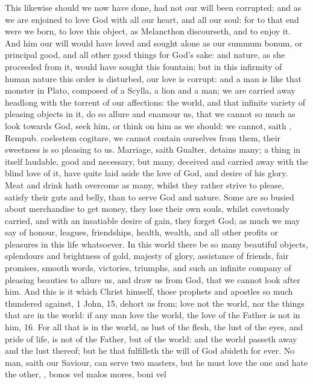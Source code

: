 {This likewise should we now have done, had not our will been corrupted;
and as we are enjoined to love God with all our heart, and all our
soul: for to that end were we born, to love this object, as
Melancthon discourseth, and to enjoy it. And him our will would
have loved and sought alone as our summum bonum, or principal good, and
all other good things for God's sake: and nature, as she proceeded from
it, would have sought this fountain; but in this infirmity of human
nature this order is disturbed, our love is corrupt: and a man is like
that monster in Plato, composed of a Scylla, a lion and a man; we
are carried away headlong with the torrent of our affections: the
world, and that infinite variety of pleasing objects in it, do so
allure and enamour us, that we cannot so much as look towards God, seek
him, or think on him as we should: we cannot, saith \Austin{}, Rempub.
coelestem cogitare, we cannot contain ourselves from them, their
sweetness is so pleasing to us. Marriage, saith  Gualter, detains
many; a thing in itself laudable, good and necessary, but many,
deceived and carried away with the blind love of it, have quite laid
aside the love of God, and desire of his glory. Meat and drink hath
overcome as many, whilst they rather strive to please, satisfy their
guts and belly, than to serve God and nature. Some are so busied about
merchandise to get money, they lose their own souls, whilst covetously
carried, and with an insatiable desire of gain, they forget God; as
much we may say of honour, leagues, friendships, health, wealth, and
all other profits or pleasures in this life whatsoever. In this
world there be so many beautiful objects, splendours and brightness of
gold, majesty of glory, assistance of friends, fair promises, smooth
words, victories, triumphs, and such an infinite company of pleasing
beauties to allure us, and draw us from God, that we cannot look after
him. And this is it which Christ himself, those prophets and apostles
so much thundered against, 1 John,  15, dehort us from; love not
the world, nor the things that are in the world: if any man love the
world, the love of the Father is not in him, 16. For all that is in the
world, as lust of the flesh, the lust of the eyes, and pride of life,
is not of the Father, but of the world: and the world passeth away and
the lust thereof; but he that fulfilleth the will of God abideth for
ever. No man, saith our Saviour, can serve two masters, but he must
love the one and hate the other, \etc{}, bonos vel malos mores, boni vel
}
